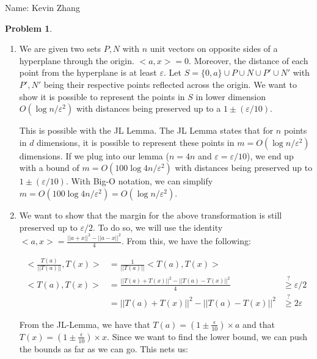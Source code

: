 \documentclass[11pt]{article}
\newcommand{\yourname}{Kevin Zhang}
\theoremstyle{definition}
\theoremstyle{case}
\theoremstyle{theorem}
\newtheorem{prob}{Problem}
\begin{document}
{\large
\noindent Name: \yourname}
\vspace{15pt}

\begin{prob}
\end{prob}

\begin{enumerate}[label=(\alph*)]

\item We are given two sets $P, N$ with $n$ unit vectors on opposite sides of a hyperplane through the origin. $<a,x> = 0$. Moreover, the distance of each
point from the hyperplane is at least $\varepsilon$. Let $S = \{0,a\} \cup P \cup N \cup P' \cup N'$ with $P',N'$ being their respective points reflected across the origin. 
We want to show it is possible to represent the points in $S$ in lower dimension $O(\log n / \varepsilon^2)$ with distances being preserved up to a $1 \pm (\varepsilon / 10)$.

This is possible with the JL Lemma. The JL Lemma states that for $n$ points in $d$ dimensions, it is possible to represent these points in $m = O(\log n / \varepsilon^2)$ dimensions. 
If we plug into our lemma ($n = 4n$ and $\varepsilon = \varepsilon/10$), we end up with a bound of $m = O(100 \log 4 n / \varepsilon^2)$ with distances being preserved up to $1 \pm (\varepsilon / 10)$.
With Big-O notation, we can simplify $m = O(100 \log 4 n / \varepsilon^2) = O(\log n / \varepsilon^2)$. 

\item We want to show that the margin for the above transformation is still preserved up to $\varepsilon / 2$. To do so, we will use
the identity $<a,x> = \frac{||a+x||^2 - ||a-x||^2}{4}$. From this, we have the following:

\begin{align*}
  <\frac{T(a)}{||T(a)||}, T(x)> &= \frac{1}{||T(a)||} <T(a), T(x)> \\ 
  <T(a), T(x)> &= \frac{||T(a)+T(x)||^2 - ||T(a)-T(x)||^2}{4} &\stackrel{?}{\geq} \varepsilon / 2 \\
               &= ||T(a)+T(x)||^2 - ||T(a)-T(x)||^2 &\stackrel{?}{\geq} 2\varepsilon  
\end{align*}

From the JL-Lemma, we have that $T(a) = (1 \pm \frac{\epsilon}{10}) \times a$ and that $T(x) = (1 \pm \frac{\epsilon}{10}) \times x$. Since we
want to find the lower bound, we can push the bounds as far as we can go. This nets us:


\end{enumerate}
\end{document}
